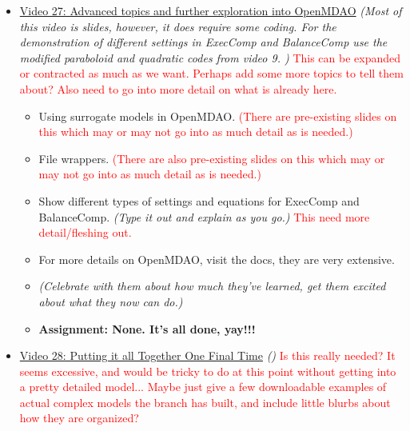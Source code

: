 \documentclass[12pt, letterpaper]{article}
\begin{document}
\begin{itemize}
	\item \underline{Video 27: Advanced topics and further exploration into OpenMDAO} \textit{(Most of this video is slides, however, it does require some coding. For the demonstration of different settings in ExecComp and BalanceComp use the modified paraboloid and quadratic codes from video 9. )} \textcolor{red}{This can be expanded or contracted as much as we want. Perhaps add some more topics to tell them about? Also need to go into more detail on what is already here.}
		\begin{itemize}
			\item Using surrogate models in OpenMDAO. \textcolor{red}{(There are pre-existing slides on this which may or may not go into as much detail as is needed.)}
			\item File wrappers. \textcolor{red}{(There are also pre-existing slides on this which may or may not go into as much detail as is needed.)}
			\item Show different types of settings and equations for ExecComp and BalanceComp. \textit{(Type it out and explain as you go.)} \textcolor{red}{This need more detail/fleshing out.}
			\item For more details on OpenMDAO, visit the docs, they are very extensive.
			\item \textit{(Celebrate with them about how much they’ve learned, get them excited about what they now can do.)}
			\item \textbf{Assignment: None. It's all done, yay!!!}
		\end{itemize}
		
	\item \underline{Video 28: Putting it all Together One Final Time} \textit{()} \textcolor{red}{Is this really needed? It seems excessive, and would be tricky to do at this point without getting into a pretty detailed model... Maybe just give a few downloadable examples of actual complex models the branch has built, and include little blurbs about how they are organized?}
	
\end{itemize}
\end{document}
